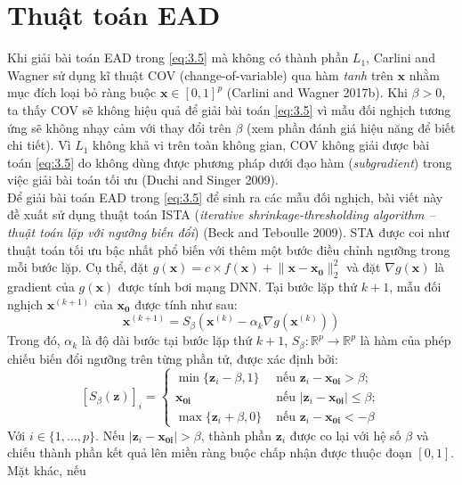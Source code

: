 \section{Thuật toán EAD}
Khi giải bài toán EAD trong \ref{eq:3.5} mà không có thành phần $L_1$, Carlini and Wagner 
sử dụng kĩ thuật COV (change-of-variable) qua hàm \textit{tanh} trên $\mathbf{x}$ nhằm 
mục đích loại bỏ ràng buộc $\mathbf{x} \in [0,1]^p$ (Carlini and Wagner 2017b). Khi 
$\beta > 0$, ta thấy COV sẽ không hiệu quả để giải bài toán \ref{eq:3.5} vì mẫu đối 
nghịch tương ứng sẽ không nhạy cảm với thay đổi trên $\beta$ (xem phần đánh giá hiệu 
năng để biết chi tiết). Vì $L_1$ không khả vi trên toàn không gian, COV không giải 
được bài toán \ref{eq:3.5} do không dùng được phương pháp dưới đạo hàm (\textit{subgradient})
trong việc giải bài toán tối ưu (Duchi and Singer 2009). \\

Để giải bài toán EAD trong \ref{eq:3.5} để sinh ra các mẫu đối nghịch, bài viết này đề
xuất sử dụng thuật toán ISTA (\textit{iterative shrinkage-thresholding algorithm – thuật toán lặp 
với ngưỡng biến đổi}) (Beck and Teboulle 2009). STA được coi như thuật toán tối ưu bậc nhất
phổ biến với thêm một bước điều chỉnh ngưỡng trong mỗi bước lặp. Cụ thể, 
đặt $g(\mathbf{x}) = c \times f(\mathbf{x}) + \lVert \mathbf{x} - \mathbf{x_0} \rVert_2^2$
và đặt $\nabla g(\mathbf{x})$ là gradient của $g(\mathbf{x})$ được tính bơi mạng DNN. 
Tại bước lặp thứ $k+1$, mẫu đối nghịch $\mathbf{x}^{(k+1)}$ của $\mathbf{x_0}$ được tính 
như sau:
\begin{equation}
    \label{eq:3.6}
    \mathbf{x}^{(k+1)} = S_{\beta} (\mathbf{x}^{(k)} - \alpha_k \nabla g(\mathbf{x}^{(k)}))
\end{equation}
Trong đó, $\alpha_k$ là độ dài bước tại bước lặp thứ $k+1$, $S_{\beta} : \mathbb{R}^p \to 
\mathbb{R}^p$ là hàm của phép chiếu biến đổi ngưỡng trên từng phần tử, được xác định bởi:
\begin{equation}
    \label{eq:3.7}
    [S_{\beta}(\mathbf{z})]_i = 
    \begin{cases}
        \min \{ \mathbf{z}_i - \beta, 1 \} &\text{ nếu } \mathbf{z}_i - \mathbf{x_{0i}} > \beta; \\
        \mathbf{x_{0i}} &\text{ nếu } |\mathbf{z}_i - \mathbf{x_{0i}}| \leq \beta; \\
        \max \{ \mathbf{z}_i + \beta, 0 \} &\text{ nếu } \mathbf{z}_i - \mathbf{x_{0i}} < -\beta
    \end{cases}
\end{equation}
Với $i \in \{ 1, ..., p \}$. Nếu $|\mathbf{z}_i - \mathbf{x_{0i}}| > \beta$, thành phần 
$\mathbf{z}_i$ được co lại với hệ số $\beta$ và chiếu thành phần kết quả lên miền ràng buộc 
chấp nhận được thuộc đoạn $[0,1]$. Mặt khác, nếu 